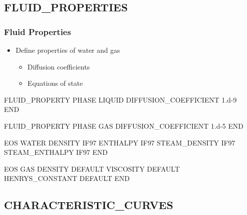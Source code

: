 \documentclass{beamer}
\begin{document}
\subsection{FLUID\_PROPERTIES}
\begin{frame}\frametitle{Fluid Properties}

\begin{itemize}
  \item Define properties of water and gas
  \begin{itemize}
    \item Diffusion coefficients
    \item Equations of state
  \end{itemize}
\end{itemize}

\begin{semiverbatim}
FLUID_PROPERTY
  PHASE LIQUID
  DIFFUSION_COEFFICIENT 1.d-9
END

FLUID_PROPERTY
  PHASE GAS
  DIFFUSION_COEFFICIENT 1.d-5
END

\newpage

EOS WATER
  DENSITY IF97
  ENTHALPY IF97
  STEAM_DENSITY IF97
  STEAM_ENTHALPY IF97
END

EOS GAS
  DENSITY DEFAULT
  VISCOSITY DEFAULT
  HENRYS_CONSTANT DEFAULT
END

\end{semiverbatim}

\end{frame}

\subsection{CHARACTERISTIC\_CURVES}
\end{document}
